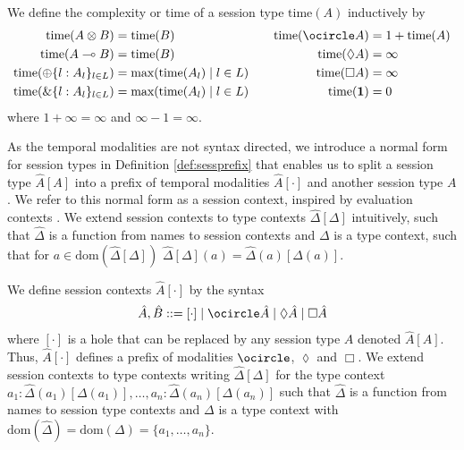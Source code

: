 \begin{defi}
We define the complexity or time of a session type $\text{time}(A)$ inductively by
\begin{align*}
    \text{time}(A\otimes B) =&\; \text{time}(B)\quad &\text{time}(\ocircle A) =&\; 1 + \text{time}(A)\\
    \text{time}(A\multimap B) =&\; \text{time}(B)\quad &\text{time}(\lozenge A) =&\; \infty\\
     \text{time}(\oplus\{l : A_l\}_{l\in L}) =&\; \text{max}(\text{time}(A_l) \mid l \in L )\quad &\text{time}(\Box A) =&\; \infty\\
    \text{time}(\&\{l : A_l\}_{l\in L}) =&\; \text{max}(\text{time}(A_l) \mid l \in L )\quad&\text{time}(\mathbf{1}) =&\; 0 %
\end{align*}\label{def:sessioncomp}
where $1 + \infty = \infty$ and $\infty - 1 = \infty$.
\end{defi}
As the temporal modalities are not syntax directed, we introduce a normal form for session types in Definition \ref{def:sessprefix} that enables us to split a session type $\hat{A}[A]$ into a prefix of temporal modalities $\hat{A}[\cdot]$ and another session type $A$.  We refer to this normal form as a session context, inspired by evaluation contexts \cite{FelleisenHieb1992}. We extend session contexts to type contexts $\hat{\Delta}[\Delta]$ intuitively, such that $\hat{\Delta}$ is a function from names to session contexts and $\Delta$ is a type context, such that for $a\in\text{dom}(\hat{\Delta}[\Delta])$ $\hat{\Delta}[\Delta](a)=\hat{\Delta}(a)[\Delta(a)]$. %
%
\begin{defi}\label{def:sessprefix}
We define session contexts $\hat{A}[\cdot]$ by the syntax
\begin{align*}
    \hat{A},\hat{B} ::= [\cdot] \mid \ocircle \hat{A} \mid \lozenge \hat{A} \mid \Box \hat{A}
\end{align*}
where $[\cdot]$ is a hole that can be replaced by any session type $A$ denoted $\hat{A}[A]$. Thus, $\hat{A}[\cdot]$ defines a prefix of modalities $\ocircle$, $\lozenge$ and $\Box$. We extend session contexts to type contexts writing $\hat{\Delta}[\Delta]$ for the type context $a_1 : \hat{\Delta}(a_1)[\Delta(a_1)],\dots,a_n : \hat{\Delta}(a_n)[\Delta(a_n)]$ such that $\hat{\Delta}$ is a function from names to session type contexts and $\Delta$ is a type context with $\text{dom}(\hat{\Delta})=\text{dom}(\Delta)=\{a_1,\dots,a_n\}$. 
\end{defi}

